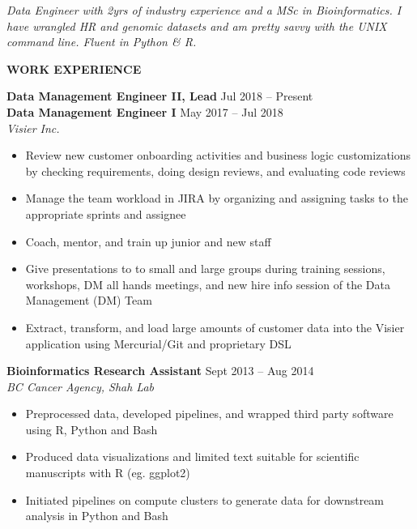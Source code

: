 \documentclass{res}
\renewcommand{\section}[1]{%
  \vspace{0.3in}%
  \centerline{\uppercase{\bf{#1}}}%
  \vspace{-6pt}}
\begin{document}
\begin{resume}


\vspace{-1em}
\begin{center}
  {\it Data Engineer with 2yrs of industry experience and a MSc in Bioinformatics. I have wrangled HR and genomic datasets and am pretty savvy with the UNIX command line. Fluent in Python \& R.}
\end{center}
\vspace{-1.5em}

\section{Work Experience}

{\bf Data Management Engineer II, Lead} \hfill Jul 2018 -- Present\\
{\bf Data Management Engineer I} \hfill May 2017 -- Jul 2018\\
{\it Visier Inc.}
\begin{itemize}
  \item Review new customer onboarding activities and business logic customizations by checking requirements, doing design reviews, and evaluating code reviews
  \item Manage the team workload in JIRA by organizing and assigning tasks to the appropriate sprints and assignee
  \item Coach, mentor, and train up junior and new staff
  \item Give presentations to to small and large groups during training sessions, workshops, DM all hands meetings, and new hire info session of the Data Management (DM) Team
  \item Extract, transform, and load large amounts of customer data into the Visier application using Mercurial/Git and proprietary DSL
\end{itemize}

{\bf Bioinformatics Research Assistant} \hfill Sept 2013 -- Aug 2014\\
{\it BC Cancer Agency, Shah Lab}
\begin{itemize}
  \item Preprocessed data, developed pipelines, and wrapped third party software using R, Python and Bash
  \item Produced data visualizations and limited text suitable for scientific manuscripts with R (eg. ggplot2)
  \item Initiated pipelines on compute clusters to generate data for downstream analysis in Python and Bash
\end{itemize}


\end{resume}
\end{document}

